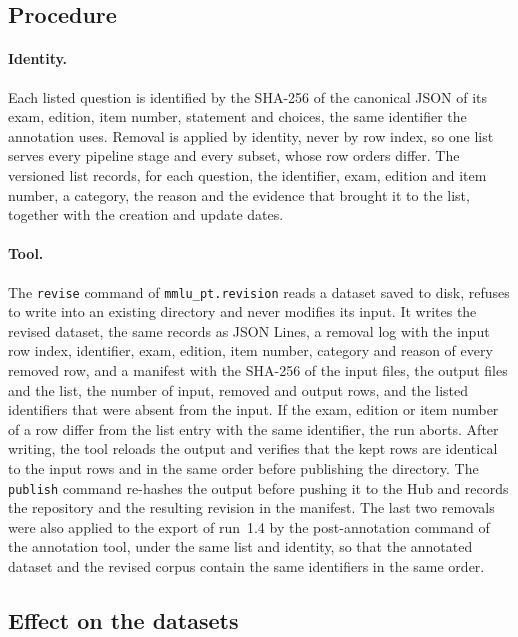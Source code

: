 \subsection{Procedure}
\label{app:rev-procedure}

\paragraph{Identity.} Each listed question is identified by the SHA-256 of
the canonical JSON of its exam, edition, item number, statement and choices,
the same identifier the annotation uses. Removal is applied by identity, never
by row index, so one list serves every pipeline stage and every subset, whose
row orders differ. The versioned list records, for each question, the
identifier, exam, edition and item number, a category, the reason and the
evidence that brought it to the list, together with the creation and update
dates.

\paragraph{Tool.} The \texttt{revise} command of \texttt{mmlu\_pt.revision}
reads a dataset saved to disk, refuses to write into an existing directory and
never modifies its input. It writes the revised dataset, the same records as
JSON Lines, a removal log with the input row index, identifier, exam,
edition, item number, category and reason of every removed row, and a
manifest with the SHA-256 of the input files, the output files and the list,
the number of input, removed and output rows, and the listed identifiers that
were absent from the input. If the exam, edition or item number of a row
differ from the list entry with the same identifier, the run aborts. After
writing, the tool reloads the output and verifies that the kept rows are
identical to the input rows and in the same order before publishing the
directory. The \texttt{publish} command re-hashes the output before pushing
it to the Hub and records the repository and the resulting revision in the
manifest. The last two removals were also applied to the export of run~1.4 by
the post-annotation command of the annotation tool, under the same list and
identity, so that the annotated dataset and the revised corpus contain the
same identifiers in the same order.

\subsection{Effect on the datasets}
\label{app:rev-effect}

